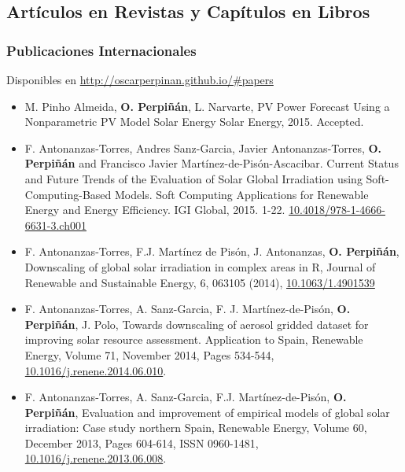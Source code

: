 \documentclass[article, a4paper]{memoir}
\begin{document}
\subsection{Artículos en Revistas y Capítulos en Libros}
\label{sec-5-2}
\subsubsection{Publicaciones Internacionales}
\label{sec-5-2-1}
Disponibles en \url{http://oscarperpinan.github.io/#papers}

\begin{itemize}
\item M. Pinho Almeida, \textbf{O. Perpiñán}, L. Narvarte, \guillemotleft{}PV Power Forecast Using a Nonparametric PV Model Solar Energy\guillemotright{} Solar Energy, 2015. Accepted.

\item F. Antonanzas-Torres, Andres Sanz-Garcia, Javier Antonanzas-Torres, \textbf{O. Perpiñán} and Francisco Javier Martínez-de-Pisón-Ascacibar. \guillemotleft{}Current Status and Future Trends of the Evaluation of Solar Global Irradiation using Soft-Computing-Based Models.\guillemotright{} Soft Computing Applications for Renewable Energy and Energy Efficiency. IGI Global, 2015. 1-22. \href{http://dx.doi.org/10.4018/978-1-4666-6631-3.ch001}{10.4018/978-1-4666-6631-3.ch001}

\item F. Antonanzas-Torres, F.J. Martínez de Pisón, J. Antonanzas, \textbf{O. Perpiñán}, Downscaling of global solar irradiation in complex areas in R, Journal of Renewable and Sustainable Energy, 6, 063105 (2014), \href{http://dx.doi.org/10.1063/1.4901539}{10.1063/1.4901539}

\item F. Antonanzas-Torres, A. Sanz-Garcia, F. J. Martínez-de-Pisón, \textbf{O. Perpiñán}, J. Polo, Towards downscaling of aerosol gridded dataset for improving solar resource assessment. Application to Spain, Renewable Energy, Volume 71, November 2014, Pages 534-544, \href{http://dx.doi.org/10.1016/j.renene.2014.06.010}{10.1016/j.renene.2014.06.010}.

\item F. Antonanzas-Torres, A. Sanz-Garcia, F.J. Martínez-de-Pisón, \textbf{O. Perpiñán}, Evaluation and improvement of empirical models of global solar irradiation: Case study northern Spain, Renewable Energy, Volume 60, December 2013, Pages 604-614, ISSN 0960-1481, \href{http://dx.doi.org/10.1016/j.renene.2013.06.008}{10.1016/j.renene.2013.06.008}.


\end{itemize}
\end{document}
